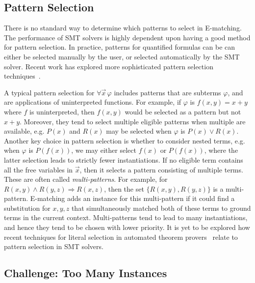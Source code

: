 \documentclass{easychair}
\begin{document}
\subsection{Pattern Selection}
There is no standard way to determine which patterns to select in E-matching.
The performance of SMT solvers is highly dependent upon having a good method for pattern selection.
In practice, patterns for quantified formulas can be can either be selected manually by the user,
or selected automatically by the SMT solver.
Recent work has explored more sophisticated pattern selection techniques~\cite{DBLP:conf/cav/LeinoP16}.

A typical pattern selection for $\forall \vec x\, \varphi$ includes patterns that are subterms $\varphi$,
and are applications of uninterpreted functions.
For example, if $\varphi$ is $f( x, y ) = x + y$ where $f$ is uninterpreted, then $f( x, y )$ would be selected as a pattern
but not $x + y$.
Moreover, they tend to select multiple eligible patterns when multiple are available, 
e.g. $P( x )$ and $R( x )$ may be selected when $\varphi$ is $P( x ) \vee R( x )$.
Another key choice in pattern selection is whether to consider nested terms, e.g. when $\varphi$ is $P( f( x ) )$,
we may either select $f( x )$ or $P( f( x ) )$, where the latter selection leads to strictly fewer instantiations.
If no eligible term contains all the free variables in $\vec x$, then it selects a pattern consisting of multiple terms.
These are often called \emph{multi-patterns}.
For example, for $R( x, y ) \wedge R( y, z ) \Rightarrow R( x, z )$, then the set $\{ R( x, y ), R( y, z ) \}$ is a multi-pattern.
E-matching adds an instance for this multi-pattern if it could find a substitution for $x, y, z$
that simultaneously matched both of these terms to ground terms in the current context.
Multi-patterns tend to lead to many instantiations, and hence they tend to be chosen with lower priority.
It is yet to be explored how recent techniques for literal selection in automated theorem provers~\cite{DBLP:conf/cade/HoderR0V16}
relate to pattern selection in SMT solvers.

\subsection{Challenge: Too Many Instances}
\end{document}
